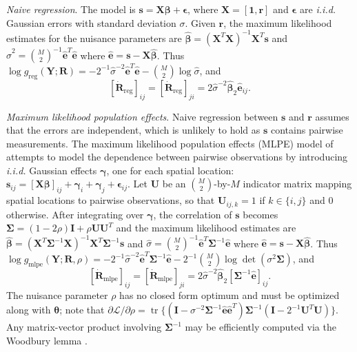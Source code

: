 \documentclass[11pt]{article}
\DeclareMathOperator*{\trace}{tr}
\newcommand{\mat}[1]{\mathbf{#1}}
\begin{document}
\emph{Naive regression}. 
The model is $\mat s =  \mat X \bm \beta + \bm \epsilon$, where
$\mat X = [\mat 1, \mat r]$ and $\bm \epsilon$ are \emph{i.i.d.} Gaussian errors with standard deviation
$\sigma$. Given $\mat r$, the maximum likelihood estimates for the nuisance
parameters are $\hat{\bm \beta} = (\mat X^T \mat X)^{-1} \mat X^T \mat s$ and 
$\hat{\sigma}^2 = {M \choose 2}^{-1} \hat{\mat e}^T \hat{\mat e}$ where 
$\hat{\mat e} = \mat s - \mat X \hat{\bm \beta}$.  Thus
$\log g_{\mathrm{reg}}(\mat Y; \mat R) = -2^{-1} \hat{\sigma}^{-2} \hat{\mat e}^T \hat{\mat e} - {M \choose 2} \log \hat{\sigma}$, and
\[
  [\dot{\mat R}_\mathrm{reg}]_{ij} = [\dot{\mat R}_\mathrm{reg}]_{ji} = 2 \hat{\sigma}^{-2} \hat{\bm \beta}_2 \hat{\mat e}_{ij}.
\]

\emph{Maximum likelihood population effects}.
Naive regression between $\mat s$ and $\mat r$ assumes that the errors are
independent, which is unlikely to hold as $\mat s$ contains pairwise
measurements. The maximum likelihood population effects (MLPE) model of
\cite{clarkeMLPE} attempts to model the dependence between pairwise
observations by introducing \emph{i.i.d.} Gaussian effects
$\bm \gamma$, one for each spatial location:
$\mat s_{ij} = [\mat X \bm \beta]_{ij} + \bm \gamma_i + \bm \gamma_j + \bm
\epsilon_{ij}$.  Let $\mat U$ be an ${M \choose 2}$-by-$M$ indicator matrix
mapping spatial locations to pairwise observations, so that $\mat U_{ij,k} = 1$
if $k \in \{i, j\}$ and $0$ otherwise.  After integrating over $\bm \gamma$, the
correlation of $\mat s$ becomes $\bm \Sigma = (1 - 2\rho) \mat I + \rho \mat U \mat U^T$ and 
the maximum likelihood estimates are 
$\hat{\bm \beta} = (\mat X^T \bm \Sigma^{-1} \mat X)^{-1} \mat X^T \bm \Sigma^{-1} \mat s$ and
$\hat{\sigma} = {M \choose 2}^{-1} \hat{\mat e}^T \bm \Sigma^{-1} \hat{\mat e}$ where 
$\hat{\mat e} = \mat s - \mat X \hat{\bm \beta}$. 
Thus $\log g_{\mathrm{mlpe}}(\mat Y; \mat R, \rho) = -2^{-1} \hat{\sigma}^{-2} \hat{\mat e}^T \bm \Sigma^{-1} \hat{\mat e} - 2^{-1} {M \choose 2} \log \det (\sigma^2 \bm \Sigma)$, and
\[
  [\dot{\mat R}_\mathrm{mlpe}]_{ij} = [\dot{\mat R}_\mathrm{mlpe}]_{ji} = 2 \hat{\sigma}^{-2} \hat{\bm \beta}_2 [\bm \Sigma^{-1} \hat{\mat e}]_{ij}.
\]
The nuisance parameter $\rho$ has no closed form optimum and must be optimized along with $\bm
\theta$; note that $\partial \mathcal{L} / \partial \rho = \trace\{ (\mat I - \sigma^{-2} \bm \Sigma^{-1} \hat{\mat e} \hat{\mat e}^T) \bm \Sigma^{-1} (\mat I - 2^{-1} \mat U^T \mat U) \}$.   
Any matrix-vector product involving $\bm \Sigma^{-1}$ may be efficiently computed via the
Woodbury lemma \cite{woodbury}.
\end{document}
